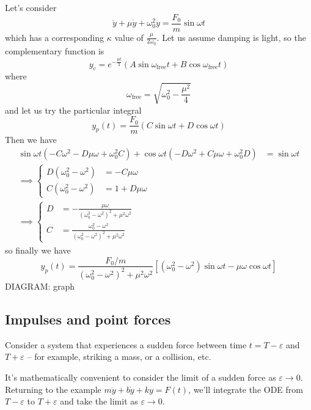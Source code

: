 \documentclass{../template/note}
\begin{document}
    Let's consider
    \[
        \ddot y + \mu \dot y + \omega_0^2 y = \frac{F_0}{m} \sin \omega t
    \]
    which has a corresponding \(\kappa\) value of \(\frac{\mu}{2\omega_0}\). Let us assume damping is light, so the complementary function is
    \[
        y_c = e^{-\frac{\mu t}{2}}(A \sin \omega_\text{free}t + B \cos \omega_\text{free}t)
    \]
    where
    \[
        \omega_\text{free} = \sqrt{\omega_0^2 - \frac{\mu^2}{4}}
    \]
    and let us try the particular integral
    \[
        y_p(t) = \frac{F_0}{m} (C \sin \omega t + D \cos \omega t)
    \]
    Then we have
    \begin{align*}
        \sin \omega t (-C\omega^2 - D \mu \omega + \omega_0^2 C) + \cos \omega t (-D \omega^2 + C \mu \omega + \omega_0^2 D) &= \sin \omega t \\
        \implies
        \begin{cases}
            D(\omega_0^2 - \omega^2) &= -C\mu \omega \\
            C(\omega_0^2 - \omega^2) &= 1 + D \mu \omega
        \end{cases}& \\
        \implies \begin{cases}
            D &= -\frac{\mu \omega}{(\omega_0^2 - \omega^2)^2 + \mu^2 \omega^2} \\
            C &= \frac{\omega_0^2 - \omega^2}{(\omega_0^2 - \omega^2)^2 + \mu^2 \omega^2}
        \end{cases}&        
    \end{align*}
    so finally we have
    \[
        y_p(t) = \frac{F_0/m}{(\omega_0^2-\omega^2)^2 + \mu^2 \omega^2}\left[(\omega_0^2-\omega^2)\sin \omega t - \mu \omega \cos \omega t\right]
    \]
    DIAGRAM: graph


    \subsection{Impulses and point forces}

    Consider a system that experiences a sudden force between time \(t = T - \varepsilon\) and \(T + \varepsilon\) -- for example, striking a mass, or a collision, etc.

    It's mathematically convenient to consider the limit of a sudden force as \(\varepsilon \to 0\). Returning to the example \(m\ddot y + b \dot y + ky = F(t)\), we'll integrate the ODE from \(T - \varepsilon\) to \(T + \varepsilon\) and take the limit as \(\varepsilon \to 0\).
\end{document}
